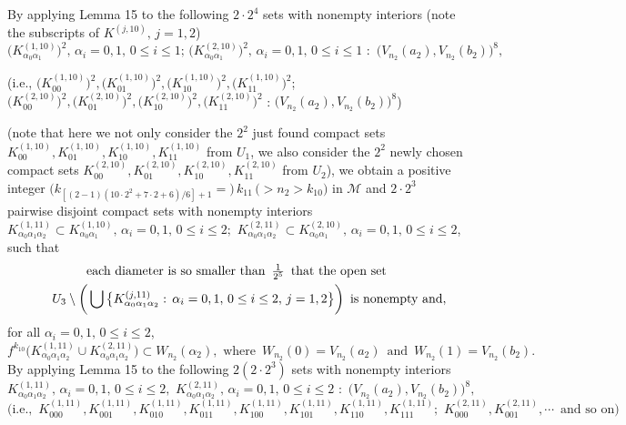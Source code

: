 \documentclass[12pt]{article}
\newcommand{\al}{\alpha}
\begin{document}
By applying Lemma 15 to the following $2 \cdot 2^4$ sets with nonempty interiors \big(note the subscripts of $K^{(j,10)}, \, j= 1, 2$\big)
$$
\big(K_{\al_0\al_1}^{(1,10)}\big)^2, \, \al_i = 0, 1, \, 0 \le i \le 1; \, \big(K_{\al_0\al_1}^{(2,10)}\big)^2, \, \al_i = 0, 1, \, 0 \le i \le 1 \,\, : \,\, \big(V_{n_2}(a_2), V_{n_2}(b_2)\big)^8,
$$
\begin{footnotesize}
\big(i.e., $\big(K_{00}^{(1,10)}\big)^2, \big(K_{01}^{(1,10)}\big)^2, \big(K_{10}^{(1,10)}\big)^2, \big(K_{11}^{(1,10)}\big)^2$; $\big(K_{00}^{(2,10)}\big)^2, \big(K_{01}^{(2,10)}\big)^2, \big(K_{10}^{(2,10)}\big)^2, \big(K_{11}^{(2,10)}\big)^2$ : $\big(V_{n_2}(a_2), V_{n_2}(b_2)\big)^8$\big)
\end{footnotesize}
\big(note that here we not only consider the $2^2$ just found compact sets $K_{00}^{(1,10)}, K_{01}^{(1,10)}, K_{10}^{(1,10)}, K_{11}^{(1,10)}$ from $U_1$, we also consider the $2^2$ newly chosen compact sets $K_{00}^{(2,10)}, K_{01}^{(2,10)}, K_{10}^{(2,10)}, K_{11}^{(2,10)}$ from $U_2$\big), we obtain a positive integer $\big(k_{[(2-1)(10 \cdot 2^2+7 \cdot 2+6)/6]+1} =) \, k_{11} \, (> n_2 > k_{10}\big)$ in $\mathcal M$ and $2 \cdot 2^3$ pairwise disjoint compact sets with nonempty interiors $K_{\al_0\al_1\al_2}^{(1,11)} \subset K_{\al_0\al_1}^{(1,10)}, \, \al_i = 0, 1, \, 0 \le i \le 2; \,\, K_{\al_0\al_1\al_2}^{(2,11)} \subset K_{\al_0\al_1}^{(2,10)}, \, \al_i = 0, 1, \, 0 \le i \le 2$, such that 
\begin{multline*}
$$
\text{each diameter is so smaller than} \,\,\, \frac 1{2^5} \,\,\, \text{that the open set} \\  \qquad U_3 \setminus \bigg( \bigcup \big\{ K_{\al_0\al_1\al_2}^{(j,11)}: \, \al_i = 0, 1, \, 0 \le i \le 2, \, j = 1, 2 \big\} \bigg) \,\,\, \text{is nonempty and},
$$
\end{multline*}
for all $\al_i = 0, 1, \, 0 \le i \le 2$, 
$$
f^{k_{10}}\big(K_{\al_0\al_1\al_2}^{(1,11)} \cup K_{\al_0\al_1\al_2}^{(2,11)}\big) \subset W_{n_2}(\al_2), \,\, \text{where} \,\,\, W_{n_2}(0) = V_{n_2}(a_2) \,\,\, \text{and} \,\,\, W_{n_2}(1) = V_{n_2}(b_2).
$$
\indent By applying Lemma 15 to the following $2(2 \cdot 2^3)$ sets with nonempty interiors 
$$
K_{\al_0\al_1\al_2}^{(1,11)}, \, \al_i = 0, 1, \, 0 \le i \le 2, \,\, K_{\al_0\al_1\al_2}^{(2,11)}, \, \al_i = 0, 1, \, 0 \le i \le 2 \,\, : \,\, \big(V_{n_2}(a_2), V_{n_2}(b_2)\big)^8,
$$
$$
\big(\text{i.e.,} \,\,\, K_{000}^{(1,11)}, K_{001}^{(1,11)}, K_{010}^{(1,11)}, K_{011}^{(1,11)}, K_{100}^{(1,11)}, K_{101}^{(1,11)}, K_{110}^{(1,11)}, K_{111}^{(1,11)}; \,\, K_{000}^{(2,11)}, K_{001}^{(2,11)}, \cdots \,\,\, \text{and so on}\big)
$$
\end{document}
